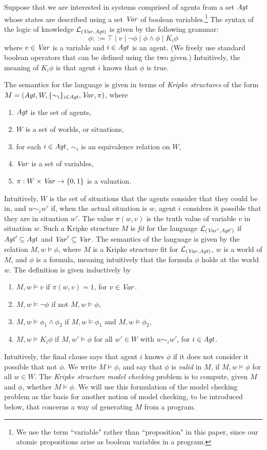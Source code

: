 \documentclass[]{llncs}
\newcommand{\lang}{{\cal L}}
\newcommand{\be}{\begin{enumerate}}
\newcommand{\ee}{\end{enumerate}}
\newcommand{\Agt}{{\it Agt}}
\newcommand{\Var}{{\it Var}}
\begin{document}
Suppose that we are interested in systems comprised of  agents
from a set $\Agt$ whose states are described using a set $\Var$ of 
boolean variables.\footnote{We use the term ``variable" rather than ``proposition" in this paper, since our
atomic propositions arise as boolean variables in a program.} 
The syntax of the  logic of knowledge $\lang_{(\Var, \Agt)}$
is given by the following grammar: 
\[
\phi ::= \top \mid v \mid \neg \phi \mid \phi \wedge \phi \mid K_i\phi 
\]
where $v\in \Var$ is a variable and $i\in \Agt$ is an agent. 
(We freely use standard boolean operators that can be defined 
using the two given.) Intuitively, the meaning of $K_i\phi$ 
is that agent $i$ knows that $\phi$ is true. 

The semantics for the language is given in terms of {\em Kripke structures} 
of the form  
$M = (\Agt, W, \{\sim_i\}_{i\in \Agt}, \Var, \pi)$, 
where 
\be 
\item $\Agt$ is the set of agents, 
\item $W$ is a set of worlds, or situations,  
\item for each $i\in \Agt$, $\sim_i$ is an equivalence relation on $W$,
\item $\Var$ is a set of variables, 
\item $\pi: W\times\Var \rightarrow \{0,1\}$ is a valuation. 
\ee 
Intuitively, $W$ is the set of situations that the agents
consider that they could be in, and $w\sim_iw'$ if, 
when the actual situation is $w$, agent $i$ considers it possible that 
they are in situation $w'$. The value $\pi(w,v)$ is the truth value of variable
$v$ in situation $w$. Such a Kripke structure $M$ is {\em fit} for the 
language $\lang_{(\Var',\Agt')}$ if $\Agt'\subseteq \Agt$ and 
$\Var'\subseteq \Var$.  The semantics of the language is given by the 
relation $M,w\models \phi$, where $M$ is a Kripke structure fit for $\lang_{(\Var,\Agt)}$, $w$ 
is a world of $M$, 
and $\phi$ is a formula, meaning intuitively that the formula $\phi$ holds at the 
world $w$. The definition is given inductively by 
\be 
\item $M,w\models v$ if $\pi(w,v)=1$, for $v\in \Var$. 
\item $M,w\models \neg \phi$ if not $M,w\models \phi$, 
\item $M,w\models \phi_1\land \phi_2$ if $M,w\models \phi_1$ and $M,w\models \phi_2$, 
\item $M,w\models K_i\phi$ if $M,w'\models \phi$ for all $w'\in W$ with $w\sim_i w'$, for $i\in \Agt$. 
\ee
Intuitively, the final clause says that 
agent $i$ knows $\phi$ if it does not consider it possible that not $\phi$. 
We write $M\models \phi$, and say that $\phi$ is {\em valid} in $M$,   if $M,w\models \phi$ for
all $w\in W$. The {\em Kripke structure model checking} problem  is to compute, given $M$ and $\phi$, 
whether $M\models \phi$.  We will use this formulation of the model checking problem as the basis for another 
notion of model checking, to be introduced below, that concerns a way of generating $M$ from a program. 
\end{document}
